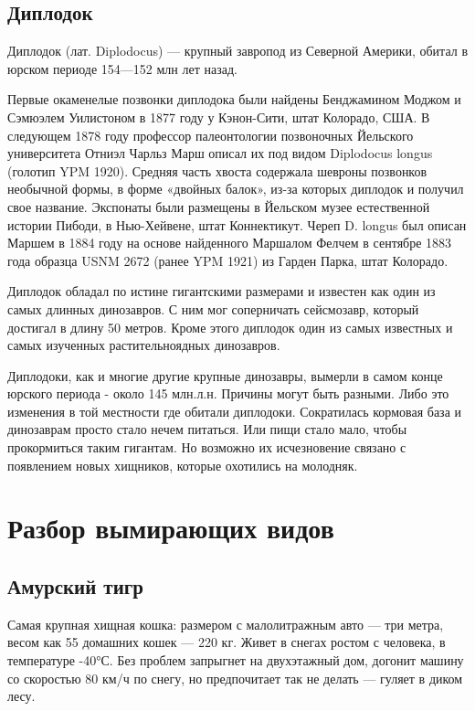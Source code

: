 \documentclass[12pt]{article}
\begin{document}
    \subsection{Диплодок}

    Диплодок (лат. Diplodocus) — крупный завропод из Северной Америки, обитал в юрском периоде 154—152 млн лет назад.

    Первые окаменелые позвонки диплодока были найдены Бенджамином Моджом и Сэмюэлем Уилистоном в 1877 году у Кэнон-Сити, штат Колорадо, США. В следующем 1878 году профессор палеонтологии позвоночных Йельского университета Отниэл Чарльз Марш описал их под видом Diplodocus longus (голотип YPM 1920). Средняя часть хвоста содержала шевроны позвонков необычной формы, в форме «двойных балок», из-за которых диплодок и получил свое название. Экспонаты были размещены в Йельском музее естественной истории Пибоди, в Нью-Хейвене, штат Коннектикут. Череп D. longus был описан Маршем в 1884 году на основе найденного Маршалом Фелчем в сентябре 1883 года образца USNM 2672 (ранее YPM 1921) из Гарден Парка, штат Колорадо.

    Диплодок обладал по истине гигантскими размерами и известен как один из самых длинных динозавров. С ним мог соперничать сейсмозавр, который достигал в длину 50 метров. Кроме этого диплодок один из самых известных и самых изученных растительноядных динозавров.

    Диплодоки, как и многие другие крупные динозавры, вымерли в самом конце юрского периода - около 145 млн.л.н. Причины могут быть разными. Либо это изменения в той местности где обитали диплодоки. Сократилась кормовая база и динозаврам просто стало нечем питаться. Или пищи стало мало, чтобы прокормиться таким гигантам. Но возможно их исчезновение связано с появлением новых хищников, которые охотились на молодняк.

    \newpage
    \section{Разбор вымирающих видов}

    \subsection{Амурский тигр}

    Самая крупная хищная кошка: размером с малолитражным авто — три метра, весом как 55 домашних кошек — 220 кг. Живет в снегах ростом с человека, в температуре -40°С. Без проблем запрыгнет на двухэтажный дом, догонит машину со скоростью 80 км/ч по снегу, но предпочитает так не делать — гуляет в диком лесу.
\end{document}
